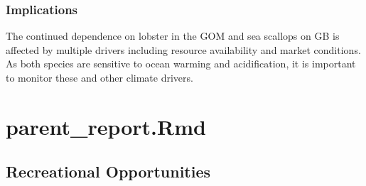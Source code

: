 \documentclass[
  10pt,
]{article}
\begin{document}
\subsubsection{Implications}\label{implications-3}

The continued dependence on lobster in the GOM and sea scallops on GB is affected by multiple drivers including resource availability and market conditions. As both species are sensitive to ocean warming and acidification, it is important to monitor these and other climate drivers.

\section{parent\_report.Rmd}\label{parent_report.rmd-4}

\subsection{Recreational Opportunities}\label{recreational-opportunities}
\end{document}
